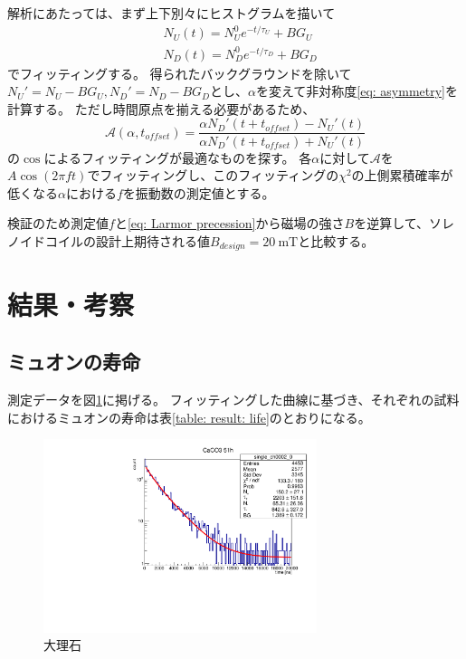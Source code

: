 \documentclass[dvipdfmx]{jsarticle}
\begin{document}
解析にあたっては、まず上下別々にヒストグラムを描いて
\begin{equation}
    \label{eq: method: rough fitting of spin polarization by exp}
    \begin{split}
        &N_U(t)=N_U^0e^{-t/\tau_U}+BG_U
        \\
        &N_D(t)=N_D^0e^{-t/\tau_D}+BG_D
    \end{split}
\end{equation}
でフィッティングする。
得られたバックグラウンドを除いて$N_U'=N_U-BG_U, N_D'=N_D-BG_D$とし、$\alpha$を変えて非対称度\eqref{eq: asymmetry}を計算する。
ただし時間原点を揃える必要があるため、
\begin{equation}
    \label{eq: method: fit asymmetry}
    \mathscr{A}(\alpha,t_{offset})
    =
    \frac{\alpha N_D'(t+t_{offset})-N_U'(t)}{\alpha N_D'(t+t_{offset})+N_U'(t)}
\end{equation}
の$\cos$によるフィッティングが最適なものを探す。
各$\alpha$に対して$\mathscr{A}$を$A\cos(2\pi ft)$でフィッティングし、このフィッティングの$\chi^2$の上側累積確率が低くなる$\alpha$における$f$を振動数の測定値とする。

検証のため測定値$f$と\eqref{eq: Larmor precession}から磁場の強さ$B$を逆算して、ソレノイドコイルの設計上期待される値$B_{design}=\SI{20}{\milli\tesla}$と比較する。


\section{結果・考察}

\subsection{ミュオンの寿命}

測定データを図\ref{fig: result: CaCO3}に掲げる。
フィッティングした曲線に基づき、それぞれの試料におけるミュオンの寿命は表\ref{table: result: life}のとおりになる。

\begin{figure}
    \centering
    \includegraphics[width=8cm]{../analysis/Life/CaCO3for51h.pdf}
    \caption{大理石}
    \label{fig: result: CaCO3}
\end{figure}
\end{document}
